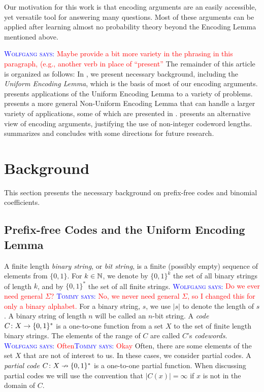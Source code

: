 \documentclass{patmorin}
\newcommand{\aremark}[3]{\textcolor{blue}{\textsc{#1 #2:}}
  \textcolor{red}{\textsf{#3}}}
\newcommand{\tommy}[2][says]{\aremark{Tommy}{#1}{#2}}
\newcommand{\wolfgang}[2][says]{\aremark{Wolfgang}{#1}{#2}}
\begin{document}
Our motivation for this work is that encoding arguments are an easily
accessible, yet versatile tool for answering many questions.  Most of
these arguments can be applied after learning almost no probability
theory beyond the Encoding Lemma mentioned above.

\wolfgang{Maybe provide a bit more variety in the phrasing in this 
paragraph, (e.g., another verb in place of ``present''}
The remainder of this article is organized as follows: In
, we present necessary background, including the
\emph{Uniform Encoding Lemma}, which is the basis of most of our
encoding arguments.   presents applications of
the Uniform Encoding Lemma to a variety of problems.  
presents a more general Non-Uniform Encoding Lemma that can handle a
larger variety of applications, some of which are presented in
.   presents an alternative view of
encoding arguments, justifying the use of non-integer codeword
lengths.   summarizes and concludes with some
directions for future research.

\section{Background}

This section presents the necessary background on prefix-free codes
and binomial coefficients.

\subsection{Prefix-free Codes and the Uniform Encoding Lemma}

A finite length \emph{binary string}, or \emph{bit string}, is a
finite (possibly empty) sequence of elements from $\{0, 1\}$. For
$k \in \mathbb{N}$, we denote by $\{0, 1\}^k$ the set of all binary strings of
length $k$, and by $\{0,1\}^*$ the set of all finite strings.
\wolfgang{Do we ever need general $\Sigma$?} \tommy{No, we never need
  general $\Sigma$, so I changed this for only a binary alphabet.}
For a binary string, $s$, we use $|s|$ to denote the length of $s$.  A
binary string of length $n$ will be called an $n$-bit string. A
\emph{code} $C\colon X\to \{0,1\}^*$ is a one-to-one function from a
set $X$ to the set of finite length binary strings.  The elements of
the range of $C$ are called $C$'s
\emph{codewords}. \wolfgang{Often}\tommy{Okay} Often, there are some
elements of the set $X$ that are not of interest to us.  In these
cases, we consider partial codes. A \emph{partial code}
$C\colon X\nrightarrow \{0,1\}^*$ is a one-to-one partial function.
When discussing partial codes we will use the convention that
$|C(x)|=\infty$ if $x$ is not in the domain of $C$.
\end{document}
